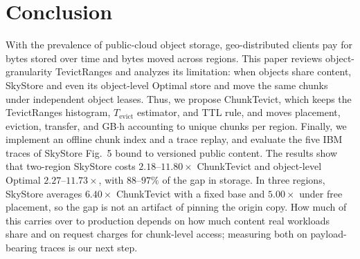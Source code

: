 \section{Conclusion}
\label{sec:conclusion}

With the prevalence of public-cloud object storage, geo-distributed clients pay for bytes stored over time and bytes moved across regions.
This paper reviews object-granularity TevictRanges and analyzes its limitation: when objects share content, SkyStore and even its object-level Optimal store and move the same chunks under independent object leases.
Thus, we propose ChunkTevict, which keeps the TevictRanges histogram, $T_{\mathrm{evict}}$ estimator, and {TTL} rule, and moves placement, eviction, transfer, and {GB}$\cdot$h accounting to unique chunks per region.
Finally, we implement an offline chunk index and a trace replay, and evaluate the five {IBM} traces of SkyStore Fig.~5 bound to versioned public content.
The results show that two-region SkyStore costs $2.18$--$11.80\times$ ChunkTevict and object-level Optimal $2.27$--$11.73\times$, with $88$--$97\%$ of the gap in storage.
In three regions, SkyStore averages $6.40\times$ ChunkTevict with a fixed base and $5.00\times$ under free placement, so the gap is not an artifact of pinning the origin copy.
How much of this carries over to production depends on how much content real workloads share and on request charges for chunk-level access; measuring both on payload-bearing traces is our next step.
